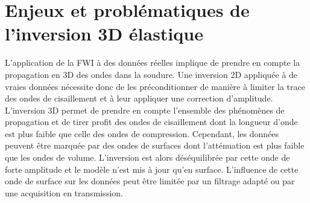  






\section{Enjeux et problématiques de l'inversion 3D élastique}

L'application de la FWI à des données réelles implique de prendre en compte la propagation en 3D des ondes dans la soudure. Une inversion 2D appliquée à de vraies données nécessite donc de les préconditionner de manière à limiter la trace des ondes de cisaillement et à leur appliquer une correction d'amplitude. \\

L'inversion 3D permet de prendre en compte l'ensemble des phénomènes de propagation et de tirer profit des ondes de cisaillement dont la longueur d'onde est plus faible que celle des ondes de compression. Cependant, les données peuvent être marquée par des ondes de surfaces dont l'atténuation est plus faible que les ondes de volume.  L'inversion est alors déséquilibrée par cette onde de forte amplitude et le modèle n'est mis à jour qu'en surface. L'influence de cette onde de surface sur les données peut être limitée par un filtrage adapté ou par une acquisition en transmission.\\ 

